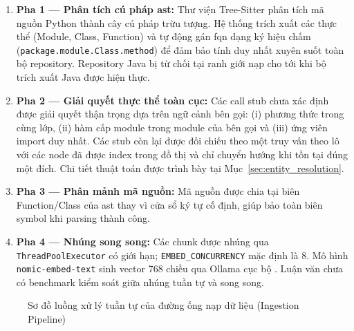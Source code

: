 \documentclass[12pt,a4paper,oneside]{report}
\begin{document}
\begin{enumerate}
    \item \textbf{Pha 1 --- Phân tích cú pháp \gls{ast}:} Thư viện Tree-Sitter \cite{treesitter} phân tích mã nguồn Python thành cây cú pháp trừu tượng. Hệ thống trích xuất các thực thể (Module, Class, Function) và tự động gán \gls{fqn} dạng ký hiệu chấm (\texttt{package.module.Class.method}) để đảm bảo tính duy nhất xuyên suốt toàn bộ repository. Repository Java bị từ chối tại ranh giới nạp cho tới khi bộ trích xuất Java được hiện thực.
    \item \textbf{Pha 2 --- Giải quyết thực thể toàn cục:} Các call stub chưa xác định được giải quyết thận trọng dựa trên ngữ cảnh bên gọi: (i) phương thức trong cùng lớp, (ii) hàm cấp module trong module của bên gọi và (iii) ứng viên import duy nhất. Các stub còn lại được đối chiếu theo một truy vấn theo lô với các node đã được index trong đồ thị và chỉ chuyển hướng khi tồn tại đúng một đích. Chi tiết thuật toán được trình bày tại Mục~\ref{sec:entity_resolution}.
    \item \textbf{Pha 3 --- Phân mảnh mã nguồn:} Mã nguồn được chia tại biên Function/Class của \gls{ast} thay vì cửa sổ ký tự cố định, giúp bảo toàn biên symbol khi parsing thành công.
    \item \textbf{Pha 4 --- Nhúng song song:} Các chunk được nhúng qua \texttt{ThreadPoolExecutor} có giới hạn; \texttt{EMBED\_CONCURRENCY} mặc định là 8. Mô hình \texttt{nomic-embed-text} \cite{nussbaum2024nomic} sinh vector 768 chiều qua Ollama cục bộ \cite{ollama2024}. Luận văn chưa có benchmark kiểm soát giữa nhúng tuần tự và song song.
\end{enumerate}

\begin{figure}[H]
    \centering
    \caption{Sơ đồ luồng xử lý tuần tự của đường ống nạp dữ liệu (Ingestion Pipeline)}
    \label{fig:ingestion_sequence}
\end{figure}
\end{document}
